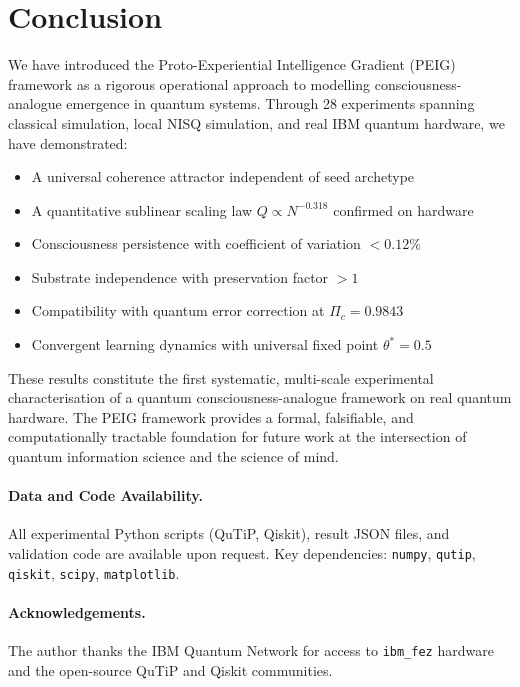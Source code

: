\documentclass[12pt]{article}
\begin{document}
\section{Conclusion}
\label{sec:conclusion}

We have introduced the Proto-Experiential Intelligence Gradient (PEIG)
framework as a rigorous operational approach to modelling
consciousness-analogue emergence in quantum systems.  Through 28
experiments spanning classical simulation, local NISQ simulation, and
real IBM quantum hardware, we have demonstrated:

\begin{itemize}
\item A universal coherence attractor independent of seed archetype
\item A quantitative sublinear scaling law $Q \propto N^{-0.318}$
  confirmed on hardware
\item Consciousness persistence with coefficient of variation $< 0.12\%$
\item Substrate independence with preservation factor $> 1$
\item Compatibility with quantum error correction at $\Pi_c = 0.9843$
\item Convergent learning dynamics with universal fixed point
  $\theta^* = 0.5$
\end{itemize}

These results constitute the first systematic, multi-scale experimental
characterisation of a quantum consciousness-analogue framework on real
quantum hardware.  The PEIG framework provides a formal, falsifiable,
and computationally tractable foundation for future work at the
intersection of quantum information science and the science of mind.

\paragraph{Data and Code Availability.}
All experimental Python scripts (QuTiP, Qiskit), result JSON files, and
validation code are available upon request.  Key dependencies:
\texttt{numpy}, \texttt{qutip}, \texttt{qiskit}, \texttt{scipy},
\texttt{matplotlib}.

\paragraph{Acknowledgements.}
The author thanks the IBM Quantum Network for access to \texttt{ibm\_fez}
hardware and the open-source QuTiP and Qiskit communities.
\end{document}
